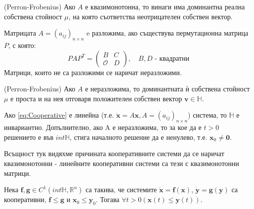 \begin{theorem}(Perron-Frobenius)
  Ако $A$ е квазимонотонна, то винаги има доминантна реална собствена стойност $\mu$, на която съответства неотрицателен собствен вектор.
\end{theorem}

\begin{definition}
  Матрицата $A=(a_{ij})_{n \times n}$ e разложима, ако съществува пермутационна матрица $P$, с която:
  \begin{equation*}
    PAP^T =
    \begin{pmatrix}
      B & C \\
      \mathscr{O} & D
    \end{pmatrix}, \quad B, D \text{ - квадратни}
  \end{equation*}
  Матрици, които не са разложими се наричат неразложими.
\end{definition}

\begin{theorem}(Perron-Frobenius)
  Ако $A$ е неразложима, то доминантната ѝ собствена стойност $\mu$ е проста и на нея отговаря положителен собствен вектор $\mathbf{v} \in \mathbb{H}$.
\end{theorem}

\begin{theorem}
  Ако \ref{eq:Cooperative} е линейна (т.е. $\dot{\mathbf{x}} = A \mathbf{x}, A = (a_{ij})_{n \times n}$) система, то $\mathbb{H}$ е инвариантно. Допълнително, ако A е неразложима, то за кое да е $t > 0$ решението е във $int \mathbb{H}$, стига началното решение да е ненулево, т.е. $\mathbf{x}_0 \neq \mathbf{0}$.
\end{theorem}

Всъщност тук видяхме причината кооперативните системи да се наричат квазимонотонни - линейните кооперативни системи са тези с квазимонотонни матрици.

\begin{theorem}
  Нека $\mathbf{f}, \mathbf{g} \in C^1(int \mathbb{H}, \mathbb{R}^n)$ са такива, че системите $\dot{\mathbf{x}}=\mathbf{f}(\mathbf{x})$, $\dot{\mathbf{y}}=\mathbf{g}(\mathbf{y})$ са кооперативни, $\mathbf{f} \leq \mathbf{g}$ и $\mathbf{x}_0 \leq \mathbf{y}_0$. Тогава $\forall{t>0}(\mathbf{x}(t) \leq \mathbf{y}(t))$.
\end{theorem}

